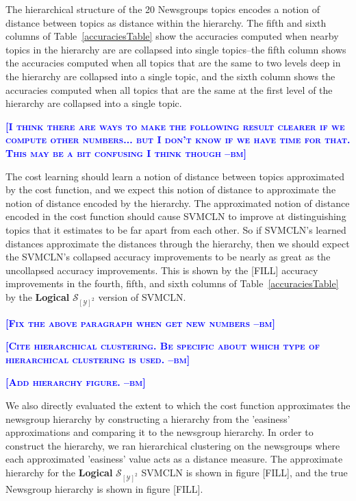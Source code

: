 \documentclass{article} %
\newcommand{\bmcomment}[1]{\textcolor{blue}{\textsc{\textbf{[#1 --bm]}}}}
\begin{document}
The hierarchical structure of the 20 Newsgroups topics encodes a notion
of distance between topics as distance within the hierarchy.  The fifth
and sixth columns of Table~\ref{accuraciesTable} show the accuracies 
computed when nearby topics in the hierarchy are are collapsed into
single topics--the fifth column shows the accuracies computed when all
topics that are the same to two levels deep in the hierarchy are collapsed
into a single topic, and the sixth column shows the accuracies computed
when all topics that are the same at the first level of the hierarchy are
collapsed into a single topic.  

\bmcomment{I think there are ways to make the following result clearer
if we compute other numbers... but I don't know if we have time for that.
This may be a bit confusing I think though}

The cost learning should learn a notion of distance between topics 
approximated by the cost function, and we expect this notion of distance
to approximate the notion of distance encoded by the hierarchy.  The 
approximated notion of distance encoded in the cost function should 
cause SVMCLN to improve at distinguishing topics that it estimates to
be far apart from each other.  So if SVMCLN's learned distances 
approximate the distances through the hierarchy, then we should expect the SVMCLN's collapsed 
accuracy improvements to be nearly as great as the uncollapsed accuracy
improvements.  This is shown by the [FILL] accuracy improvements in the
fourth, fifth, and sixth columns of Table~\ref{accuraciesTable} by
the \textbf{Logical} $\mathcal{S}_{[\mathcal{Y}]^2}$ version of SVMCLN.

\bmcomment{Fix the above paragraph when get new numbers}

\bmcomment{Cite hierarchical clustering.  Be specific about which
type of hierarchical clustering is used.}

\bmcomment{Add hierarchy figure.}

We also directly evaluated the extent to which the cost function approximates
the newsgroup hierarchy by constructing a hierarchy from the 
'easiness' approximations and comparing it to the newsgroup hierarchy.
In order to construct the hierarchy, we ran hierarchical clustering on
the newsgroups where each approximated 'easiness' value acts as a
distance measure.  The approximate hierarchy for the \textbf{Logical}
$\mathcal{S}_{[\mathcal{Y}]^2}$ SVMCLN is shown in figure [FILL], and the true
Newsgroup hierarchy is shown in figure [FILL].  
\end{document}
